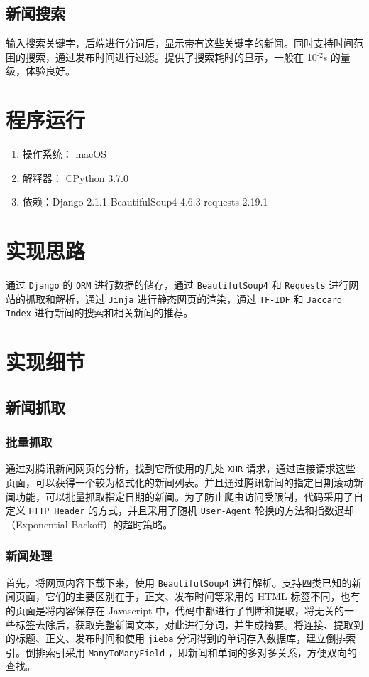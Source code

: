 \documentclass[11pt]{article}
\begin{document}
\subsection{新闻搜索}
\label{sec:org8fc7be3}
输入搜索关键字，后端进行分词后，显示带有这些关键字的新闻。同时支持时间范围的搜索，通过发布时间进行过滤。提供了搜索耗时的显示，一般在 10\(^{\text{-2}}\)s 的量级，体验良好。

\section{程序运行}
\label{sec:org141c57a}
\begin{enumerate}
\item 操作系统： macOS
\item 解释器： CPython 3.7.0
\item 依赖：Django 2.1.1 BeautifulSoup4 4.6.3 requests 2.19.1
\end{enumerate}


\section{实现思路}
\label{sec:org3b1e4b7}
通过 \texttt{Django} 的 \texttt{ORM} 进行数据的储存，通过 \texttt{BeautifulSoup4} 和 \texttt{Requests} 进行网站的抓取和解析，通过 \texttt{Jinja} 进行静态网页的渲染，通过 \texttt{TF-IDF} 和 \texttt{Jaccard Index} 进行新闻的搜索和相关新闻的推荐。

\section{实现细节}
\label{sec:org74b12eb}
\subsection{新闻抓取}
\label{sec:orgdd003ea}
\subsubsection{批量抓取}
\label{sec:orge252821}
通过对腾讯新闻网页的分析，找到它所使用的几处 \texttt{XHR} 请求，通过直接请求这些页面，可以获得一个较为格式化的新闻列表。并且通过腾讯新闻的指定日期滚动新闻功能，可以批量抓取指定日期的新闻。为了防止爬虫访问受限制，代码采用了自定义 \texttt{HTTP Header} 的方式，并且采用了随机 \texttt{User-Agent} 轮换的方法和指数退却（Exponential Backoff）的超时策略。
\subsubsection{新闻处理}
\label{sec:orge3269bc}
首先，将网页内容下载下来，使用 \texttt{BeautifulSoup4} 进行解析。支持四类已知的新闻页面，它们的主要区别在于，正文、发布时间等采用的 HTML 标签不同，也有的页面是将内容保存在 Javascript 中，代码中都进行了判断和提取，将无关的一些标签去除后，获取完整新闻文本，对此进行分词，并生成摘要。将连接、提取到的标题、正文、发布时间和使用 \texttt{jieba} 分词得到的单词存入数据库，建立倒排索引。倒排索引采用 \texttt{ManyToManyField} ，即新闻和单词的多对多关系，方便双向的查找。
\end{document}
